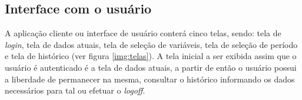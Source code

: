 
\newpage

\subsection{Interface com o usuário} \label{subsec:interfaceComOUsurario}

A aplicação cliente ou interface de usuário conterá cinco telas, sendo: tela de \textit{login}, tela de dados atuais, tela de seleção de variáveis, tela de seleção de período e tela de histórico (ver figura \ref{img:telas}). A tela inicial a ser exibida assim que o usuário é autenticado é a tela de dados atuais, a partir de então o usuário possui a liberdade de permanecer na mesma, consultar o histórico informando os dados necessários para tal ou efetuar o \textit{logoff}.

